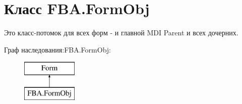 \hypertarget{class_f_b_a_1_1_form_obj}{}\section{Класс F\+B\+A.\+Form\+Obj}
\label{class_f_b_a_1_1_form_obj}


Это класс-\/потомок для всех форм -\/ и главной M\+DI Parent и всех дочерних. ~\newline
 


Граф наследования\+:F\+B\+A.\+Form\+Obj\+:\begin{figure}[H]
\begin{center}
\leavevmode
\includegraphics[height=2.000000cm]{class_f_b_a_1_1_form_obj}
\end{center}
\end{figure}
